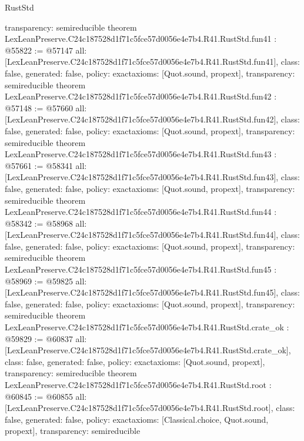 \begin{lexlean}{RustStd}
\begin{coremodule}
{  transparency: semireducible
}
theorem LexLeanPreserve.C24c187528d1f71c5fce57d0056e4e7b4.R41.RustStd.fun41 : @55822 := @57147 {
  all: [LexLeanPreserve.C24c187528d1f71c5fce57d0056e4e7b4.R41.RustStd.fun41],
  class: false,
  generated: false,
  policy: exact{axioms: [Quot.sound, propext]},
  transparency: semireducible
}
theorem LexLeanPreserve.C24c187528d1f71c5fce57d0056e4e7b4.R41.RustStd.fun42 : @57148 := @57660 {
  all: [LexLeanPreserve.C24c187528d1f71c5fce57d0056e4e7b4.R41.RustStd.fun42],
  class: false,
  generated: false,
  policy: exact{axioms: [Quot.sound, propext]},
  transparency: semireducible
}
theorem LexLeanPreserve.C24c187528d1f71c5fce57d0056e4e7b4.R41.RustStd.fun43 : @57661 := @58341 {
  all: [LexLeanPreserve.C24c187528d1f71c5fce57d0056e4e7b4.R41.RustStd.fun43],
  class: false,
  generated: false,
  policy: exact{axioms: [Quot.sound, propext]},
  transparency: semireducible
}
theorem LexLeanPreserve.C24c187528d1f71c5fce57d0056e4e7b4.R41.RustStd.fun44 : @58342 := @58968 {
  all: [LexLeanPreserve.C24c187528d1f71c5fce57d0056e4e7b4.R41.RustStd.fun44],
  class: false,
  generated: false,
  policy: exact{axioms: [Quot.sound, propext]},
  transparency: semireducible
}
theorem LexLeanPreserve.C24c187528d1f71c5fce57d0056e4e7b4.R41.RustStd.fun45 : @58969 := @59825 {
  all: [LexLeanPreserve.C24c187528d1f71c5fce57d0056e4e7b4.R41.RustStd.fun45],
  class: false,
  generated: false,
  policy: exact{axioms: [Quot.sound, propext]},
  transparency: semireducible
}
theorem LexLeanPreserve.C24c187528d1f71c5fce57d0056e4e7b4.R41.RustStd.crate_ok : @59829 := @60837 {
  all: [LexLeanPreserve.C24c187528d1f71c5fce57d0056e4e7b4.R41.RustStd.crate_ok],
  class: false,
  generated: false,
  policy: exact{axioms: [Quot.sound, propext]},
  transparency: semireducible
}
theorem LexLeanPreserve.C24c187528d1f71c5fce57d0056e4e7b4.R41.RustStd.root : @60845 := @60855 {
  all: [LexLeanPreserve.C24c187528d1f71c5fce57d0056e4e7b4.R41.RustStd.root],
  class: false,
  generated: false,
  policy: exact{axioms: [Classical.choice, Quot.sound, propext]},
  transparency: semireducible
}


\end{coremodule}
\end{lexlean}
